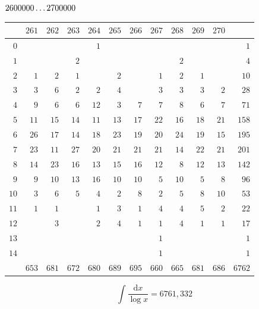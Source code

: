 \clearpage
\noindent\begin{minipage}{\linewidth}\centering
{}
\(2600000\mathinner{.\,.\,.}2700000\)\par\smallskip
\begingroup\fontsize{10.5}{11.5}\selectfont\setlength{\tabcolsep}{3.5pt}\renewcommand{\arraystretch}{1}
\begin{tabular}{r|rrrrrrrrrr|r}\hline
 & $261$ & $262$ & $263$ & $264$ & $265$ & $266$ & $267$ & $268$ & $269$ & $270$ &  \\ \hline
$0$ &  &  &  & $1$ &  &  &  &  &  &  & $1$ \\
$1$ &  &  & $2$ &  &  &  &  & $2$ &  &  & $4$ \\
$2$ & $1$ & $2$ & $1$ &  & $2$ &  & $1$ & $2$ & $1$ &  & $10$ \\
$3$ & $3$ & $6$ & $2$ & $2$ & $4$ &  & $3$ & $3$ & $3$ & $2$ & $28$ \\
$4$ & $9$ & $6$ & $6$ & $12$ & $3$ & $7$ & $7$ & $8$ & $6$ & $7$ & $71$ \\
$5$ & $11$ & $15$ & $14$ & $11$ & $13$ & $17$ & $22$ & $16$ & $18$ & $21$ & $158$ \\
$6$ & $26$ & $17$ & $14$ & $18$ & $23$ & $19$ & $20$ & $24$ & $19$ & $15$ & $195$ \\
$7$ & $23$ & $11$ & $27$ & $20$ & $21$ & $21$ & $21$ & $14$ & $22$ & $21$ & $201$ \\
$8$ & $14$ & $23$ & $16$ & $13$ & $15$ & $16$ & $12$ & $8$ & $12$ & $13$ & $142$ \\
$9$ & $9$ & $10$ & $13$ & $16$ & $10$ & $10$ & $5$ & $10$ & $5$ & $8$ & $96$ \\
$10$ & $3$ & $6$ & $5$ & $4$ & $2$ & $8$ & $2$ & $5$ & $8$ & $10$ & $53$ \\
$11$ & $1$ & $1$ &  & $1$ & $3$ & $1$ & $4$ & $4$ & $5$ & $2$ & $22$ \\
$12$ &  & $3$ &  & $2$ & $4$ & $1$ & $1$ & $4$ & $1$ & $1$ & $17$ \\
$13$ &  &  &  &  &  &  & $1$ &  &  &  & $1$ \\
$14$ &  &  &  &  &  &  & $1$ &  &  &  & $1$ \\
\hline
 & $653$ & $681$ & $672$ & $680$ & $689$ & $695$ & $660$ & $665$ & $681$ & $686$ & $6762$ \\ \hline
\end{tabular}\par\endgroup
\setlength{\abovedisplayskip}{6pt}\setlength{\belowdisplayskip}{4pt}
\[\int\frac{\mathrm{d}x}{\log x}=6761{,}332\]
\end{minipage}\par

